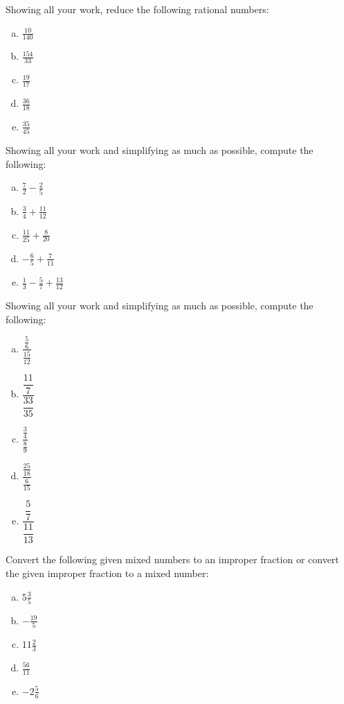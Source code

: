 \documentclass[11pt,letterpaper]{article}
\begin{document}

 Showing all your work, reduce the following rational numbers:
	\begin{enumerate}[(a)]
	\item $\frac{10}{140}$
	\item $\frac{154}{33}$
	\item $\frac{19}{17}$
	\item $\frac{36}{18}$
	\item $\frac{35}{45}$
	\end{enumerate}



\newpage



 Showing all your work and simplifying as much as possible, compute the following:
	\begin{enumerate}[(a)]
	\item $\frac{7}{2} - \frac{2}{5}$
	\item $\frac{3}{4} + \frac{11}{12}$
	\item $\frac{11}{25} + \frac{8}{20}$
	\item $-\frac{6}{5} + \frac{7}{11}$
	\item $\frac{1}{3} - \frac{5}{7} + \frac{13}{12}$
	\end{enumerate}



\newpage



 Showing all your work and simplifying as much as possible, compute the following:
	\begin{enumerate}[(a)]
	\item $\dfrac{\frac{5}{6}}{\frac{15}{12}}$
	\item $\dfrac{\dfrac{11}{7}}{\dfrac{33}{35}}$
	\item $\dfrac{\frac{3}{4}}{\frac{8}{9}}$
	\item $\dfrac{\frac{25}{18}}{\frac{6}{15}}$
	\item $\dfrac{\dfrac{5}{7}}{\dfrac{11}{13}}$
	\end{enumerate}



\newpage



 Convert the following given mixed numbers to an improper fraction or convert the given improper fraction to a mixed number:
	\begin{enumerate}[(a)]
	\item $5 \frac{3}{5}$
	\item $-\frac{19}{5}$
	\item $11 \frac{2}{3}$
	\item $\frac{56}{11}$
	\item $-2 \frac{5}{6}$
	\end{enumerate}
\end{document}
